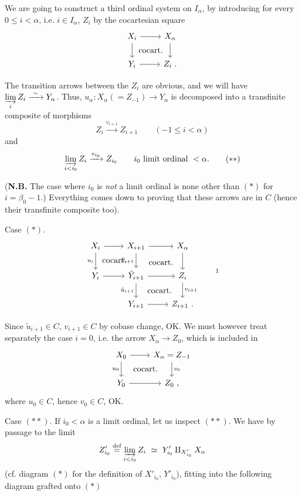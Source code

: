 \documentclass[11pt]{article}
\newcommand{\printedpage}[1]{\marginpar{\footnotesize p.~#1}}
\newcommand{\msp}[1]{\marginpar{\footnotesize [#1]}}
\begin{document}
We are going to construct a third ordinal system on $I_\alpha$, by introducing for every $0 \leq i < \alpha$, i.e. $i \in I_\alpha$, $Z_i$ by the cocartesian square
\printedpage{3}
\[
\begin{tikzcd}
X_i \arrow[r] \arrow[d] \arrow[dr, phantom, "\text{cocart.}"] & X_\alpha \arrow[d] \\
Y_i \arrow[r] & Z_i\ .
\end{tikzcd}
\]

The transition arrows between the $Z_i$ are obvious, and we will have $\varinjlim\limits_{i} Z_i \xrightarrow{\ \sim\ } Y_\alpha$. Thus, $u_\alpha : X_\alpha (= Z_{-1}) \longrightarrow Y_\alpha$ is decomposed into a transfinite composite of morphisms
\msp{page 6}
\[
Z_i \xrightarrow{v_{i+1}} Z_{i+1} \qquad (-1 \leq i < \alpha)
\tag*{$(*)$}
\]
and
\[
\varinjlim_{i<i_0} Z_i \xrightarrow{v_{i_0}} Z_{i_0} \qquad i_0 \text{ limit ordinal } < \alpha.
\tag*{$(**)$}
\]

(\textbf{N.B.} The case where $i_0$ is \textit{not} a limit ordinal is none other than $(*)$ for $i = \beta_0 - 1$.) Everything comes down to proving that these arrows are in $C$ (hence their transfinite composite too). %

Case $(*)$.
\[
\begin{tikzcd}
X_i \arrow[r] \arrow[d, "u_i"'] \arrow[dr, phantom, "\text{cocart.}"] & X_{i+1} \arrow[r] \arrow[d, "\beta_{i+1}"'] \arrow[dr, phantom, "\text{cocart.}"] & X_\alpha \arrow[d] \\
Y_i \arrow[r] & \tilde{Y}_{i+1} \arrow[r] \arrow[d, "\tilde{u}_{i+1}"'] \arrow[dr, phantom, "\text{cocart.}"] & Z_i \arrow[d, "v_{i+1}"] \\
& Y_{i+1} \arrow[r] & Z_{i+1}\ .
\end{tikzcd}
\tag*{\footnotemark}
\]

Since $\tilde{u}_{i+1} \in C$, $v_{i+1} \in C$ by cobase change, OK. We must however treat separately the case $i = 0$, i.e. the arrow $X_\alpha \longrightarrow Z_0$, which is included in
\[
\begin{tikzcd}
X_0 \arrow[r] \arrow[d, "u_0"'] \arrow[dr, phantom, "\text{cocart.}"] & X_\alpha = Z_{-1} \arrow[d, "v_0"] \\
Y_0 \arrow[r] & Z_0\ ,
\end{tikzcd}
\]
where $u_0 \in C$, hence $v_0 \in C$, OK.

Case $(**)$. If $i_0 < \alpha$ is a limit ordinal, let us inspect $(**)$. We have by passage to the limit
\[
Z'_{i_0} \overset{\text{def}}{=} \varinjlim_{i<i_0} Z_i \ \simeq\ Y'_{i_0} \amalg_{X'_{i_0}} X_\alpha
\]
(cf. diagram $(*)$ for the definition of $X'_{i_0}$, $Y'_{i_0}$), fitting into the following diagram grafted onto $(*)$
\end{document}
